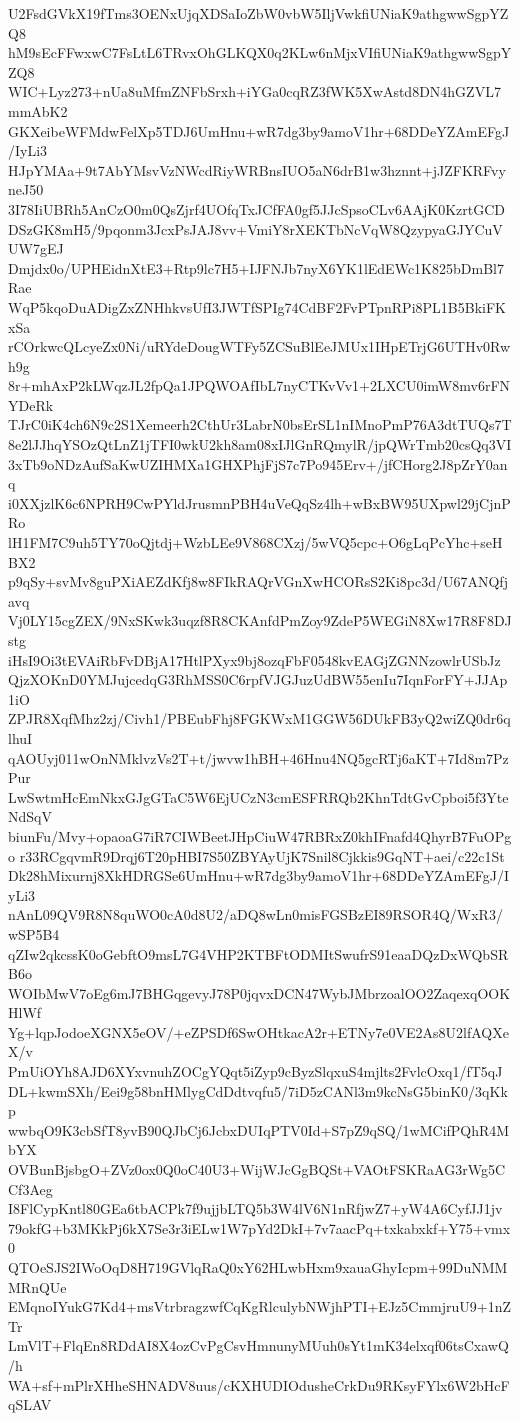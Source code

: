 U2FsdGVkX19fTms3OENxUjqXDSaIoZbW0vbW5IljVwkfiUNiaK9athgwwSgpYZQ8
hM9sEcFFwxwC7FsLtL6TRvxOhGLKQX0q2KLw6nMjxVIfiUNiaK9athgwwSgpYZQ8
WIC+Lyz273+nUa8uMfmZNFbSrxh+iYGa0cqRZ3fWK5XwAstd8DN4hGZVL7mmAbK2
GKXeibeWFMdwFelXp5TDJ6UmHnu+wR7dg3by9amoV1hr+68DDeYZAmEFgJ/IyLi3
HJpYMAa+9t7AbYMsvVzNWcdRiyWRBnsIUO5aN6drB1w3hznnt+jJZFKRFvyneJ50
3I78IiUBRh5AnCzO0m0QsZjrf4UOfqTxJCfFA0gf5JJcSpsoCLv6AAjK0KzrtGCD
DSzGK8mH5/9pqonm3JcxPsJAJ8vv+VmiY8rXEKTbNcVqW8QzypyaGJYCuVUW7gEJ
Dmjdx0o/UPHEidnXtE3+Rtp9lc7H5+IJFNJb7nyX6YK1lEdEWc1K825bDmBl7Rae
WqP5kqoDuADigZxZNHhkvsUfI3JWTfSPIg74CdBF2FvPTpnRPi8PL1B5BkiFKxSa
rCOrkwcQLcyeZx0Ni/uRYdeDougWTFy5ZCSuBlEeJMUx1IHpETrjG6UTHv0Rwh9g
8r+mhAxP2kLWqzJL2fpQa1JPQWOAfIbL7nyCTKvVv1+2LXCU0imW8mv6rFNYDeRk
TJrC0iK4ch6N9c2S1Xemeerh2CthUr3LabrN0bsErSL1nIMnoPmP76A3dtTUQs7T
8e2lJJhqYSOzQtLnZ1jTFI0wkU2kh8am08xIJlGnRQmylR/jpQWrTmb20csQq3VI
3xTb9oNDzAufSaKwUZIHMXa1GHXPhjFjS7c7Po945Erv+/jfCHorg2J8pZrY0anq
i0XXjzlK6c6NPRH9CwPYldJrusmnPBH4uVeQqSz4lh+wBxBW95UXpwl29jCjnPRo
lH1FM7C9uh5TY70oQjtdj+WzbLEe9V868CXzj/5wVQ5cpc+O6gLqPcYhc+seHBX2
p9qSy+svMv8guPXiAEZdKfj8w8FIkRAQrVGnXwHCORsS2Ki8pc3d/U67ANQfjavq
Vj0LY15cgZEX/9NxSKwk3uqzf8R8CKAnfdPmZoy9ZdeP5WEGiN8Xw17R8F8DJstg
iHsI9Oi3tEVAiRbFvDBjA17HtlPXyx9bj8ozqFbF0548kvEAGjZGNNzowlrUSbJz
QjzXOKnD0YMJujcedqG3RhMSS0C6rpfVJGJuzUdBW55enIu7IqnForFY+JJAp1iO
ZPJR8XqfMhz2zj/Civh1/PBEubFhj8FGKWxM1GGW56DUkFB3yQ2wiZQ0dr6qlhuI
qAOUyj011wOnNMklvzVs2T+t/jwvw1hBH+46Hnu4NQ5gcRTj6aKT+7Id8m7PzPur
LwSwtmHcEmNkxGJgGTaC5W6EjUCzN3cmESFRRQb2KhnTdtGvCpboi5f3YteNdSqV
biunFu/Mvy+opaoaG7iR7CIWBeetJHpCiuW47RBRxZ0khIFnafd4QhyrB7FuOPgo
r33RCgqvmR9Drqj6T20pHBI7S50ZBYAyUjK7Snil8Cjkkis9GqNT+aei/c22c1St
Dk28hMixurnj8XkHDRGSe6UmHnu+wR7dg3by9amoV1hr+68DDeYZAmEFgJ/IyLi3
nAnL09QV9R8N8quWO0cA0d8U2/aDQ8wLn0misFGSBzEI89RSOR4Q/WxR3/wSP5B4
qZIw2qkcssK0oGebftO9msL7G4VHP2KTBFtODMItSwufrS91eaaDQzDxWQbSRB6o
WOIbMwV7oEg6mJ7BHGqgevyJ78P0jqvxDCN47WybJMbrzoalOO2ZaqexqOOKHlWf
Yg+lqpJodoeXGNX5eOV/+eZPSDf6SwOHtkacA2r+ETNy7e0VE2As8U2lfAQXeX/v
PmUiOYh8AJD6XYxvnuhZOCgYQqt5iZyp9cByzSlqxuS4mjlts2FvlcOxq1/fT5qJ
DL+kwmSXh/Eei9g58bnHMlygCdDdtvqfu5/7iD5zCANl3m9kcNsG5binK0/3qKkp
wwbqO9K3cbSfT8yvB90QJbCj6JcbxDUIqPTV0Id+S7pZ9qSQ/1wMCifPQhR4MbYX
OVBunBjsbgO+ZVz0ox0Q0oC40U3+WijWJcGgBQSt+VAOtFSKRaAG3rWg5CCf3Aeg
I8FlCypKntl80GEa6tbACPk7f9ujjbLTQ5b3W4lV6N1nRfjwZ7+yW4A6CyfJJ1jv
79okfG+b3MKkPj6kX7Se3r3iELw1W7pYd2DkI+7v7aacPq+txkabxkf+Y75+vmx0
QTOeSJS2IWoOqD8H719GVlqRaQ0xY62HLwbHxm9xauaGhyIcpm+99DuNMMMRnQUe
EMqnoIYukG7Kd4+msVtrbragzwfCqKgRlculybNWjhPTI+EJz5CmmjruU9+1nZTr
LmVlT+FlqEn8RDdAI8X4ozCvPgCsvHmnunyMUuh0sYt1mK34elxqf06tsCxawQ/h
WA+sf+mPlrXHheSHNADV8uus/cKXHUDIOdusheCrkDu9RKsyFYlx6W2bHcFqSLAV

